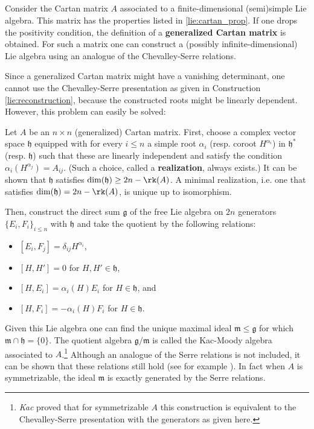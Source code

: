 \subsection{}

    \begin{construct}\label{lie:kac_moody}
        Consider the Cartan matrix $A$ associated to a finite-dimensional (semi)simple Lie algebra. This matrix has the properties listed in \ref{lie:cartan_prop}. If one drops the positivity condition, the definition of a \textbf{generalized Cartan matrix} is obtained. For such a matrix one can construct a (possibly infinite-dimensional) Lie algebra using an analogue of the Chevalley-Serre relations.

        Since a generalized Cartan matrix might have a vanishing determinant, one cannot use the Chevalley-Serre presentation as given in Construction \ref{lie:reconstruction}, because the constructed roots might be linearly dependent. However, this problem can easily be solved:

        \qquad Let $A$ be an $n\times n$ (generalized) Cartan matrix. First, choose a complex vector space $\mathfrak{h}$ equipped with for every $i\leq n$ a simple root $\alpha_i$ (resp. coroot $H^{\alpha_i}$) in $\mathfrak{h}^*$ (resp. $\mathfrak{h}$) such that these are linearly independent and satisfy the condition $\alpha_i(H^{\alpha_j})=A_{ij}$. (Such a choice, called a \textbf{realization}, always exists.) It can be shown that $\mathfrak{h}$ satisfies $\dim(\mathfrak{h})\geq2n-\rk(A)$. A minimal realization, i.e. one that satisfies $\dim(\mathfrak{h})=2n-\rk(A)$, is unique up to isomorphism.

         Then, construct the direct sum $\mathfrak{g}$ of the free Lie algebra on $2n$ generators $\{E_i,F_i\}_{i\leq n}$ with $\mathfrak{h}$ and take the quotient by the following relations:
        \begin{itemize}
            \item $[E_i,F_j] = \delta_{ij}H^{\alpha_i}$,
            \item $[H,H']=0$ for $H,H'\in\mathfrak{h}$,
            \item $[H,E_i]=\alpha_i(H)E_i$ for $H\in\mathfrak{h}$, and
            \item $[H,F_i]=-\alpha_i(H)F_i$ for $H\in\mathfrak{h}$.
        \end{itemize}
        Given this Lie algebra one can find the unique maximal ideal $\mathfrak{m}\leq\mathfrak{g}$ for which $\mathfrak{m}\cap\mathfrak{h}=\{0\}$. The quotient algebra $\mathfrak{g}/\mathfrak{m}$ is called the Kac-Moody algebra associated to $A$.\footnote{\textit{Kac} proved that for symmetrizable $A$ this construction is equivalent to the Chevalley-Serre presentation with the generators as given here.} Although an analogue of the Serre relations is not included, it can be shown that these relations still hold (see for example \cite{aminiinfinite}). In fact when $A$ is symmetrizable, the ideal $\mathfrak{m}$ is exactly generated by the Serre relations.
    \end{construct}
